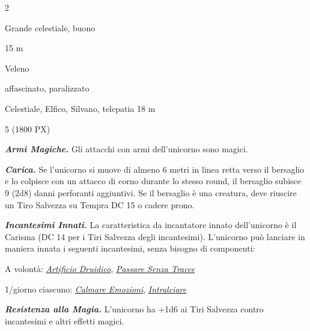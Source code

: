 \begin{multicols}{2}
{
\begin{description}[noitemsep, topsep=0pt, parsep=0pt, partopsep=0pt, itemsep=1pt, leftmargin=2.35cm,  labelwidth=2.2cm, itemindent=0cm, listparindent=0pt] %
\setlength{\baselineskip}{10pt}
\item[\textbf{Taglia/Tipo}] Grande celestiale, buono
\item[\textbf{Caratt.}] 
\item[\textbf{Punti Ferita}] 
\item[\textbf{Movimento}] 15 m
\item[\textbf{Tiri Salvez.}] 
\item[\textbf{Imm. Danni}] Veleno
\item[\textbf{Immunità}] affascinato, paralizzato
\item[\textbf{Sensi}] 
\item[\textbf{Linguaggi}] Celestiale, Elfico, Silvano, telepatia 18 m
\item[\textbf{Sfida}] 5 (1800 PX)
\end{description}
\smallskip

\emph{\textbf{Armi Magiche.}} Gli attacchi con armi dell'unicorno sono magici.

\emph{\textbf{Carica.}} Se l'unicorno si muove di almeno 6 metri in linea retta verso il bersaglio e lo colpisce con un attacco di corno durante lo stesso round, il bersaglio subisce 9 (2d8) danni perforanti aggiuntivi. Se il bersaglio è una creatura, deve riuscire un Tiro Salvezza su Tempra DC 15 o cadere prono.

\emph{\textbf{Incantesimi Innati.}} La caratteristica da incantatore innato dell'unicorno è il Carisma (DC 14 per i Tiri Salvezza degli incantesimi). L'unicorno può lanciare in maniera innata i seguenti incantesimi, senza bisogno di componenti:

A volontà: \emph{\hyperlink{Artificio Druidico}{Artificio Druidico}}, \emph{\hyperlink{Passare Senza Tracce}{Passare Senza Tracce}}

1/giorno ciascuno: \emph{\hyperlink{Calmare Emozioni}{Calmare Emozioni}}, \emph{\hyperlink{Intralciare}{Intralciare}}

\emph{\textbf{Resistenza alla Magia.}} L'unicorno ha +1d6 ai Tiri Salvezza contro incantesimi e altri effetti magici.

}
\end{multicols}
